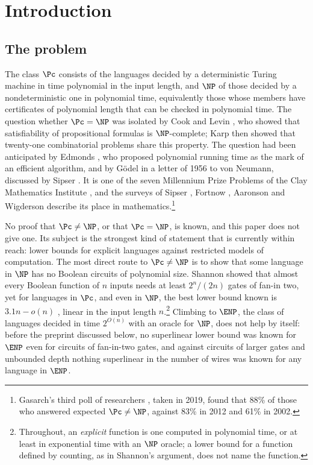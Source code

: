 
\section{Introduction}\label{sec:intro}

\subsection{The problem}
The class $\Pc$ consists of the languages decided by a deterministic Turing
machine in time polynomial in the input length, and $\NP$ of those decided by a
nondeterministic one in polynomial time, equivalently those whose members have
certificates of polynomial length that can be checked in polynomial time. The
question whether $\Pc=\NP$ was isolated by Cook \cite{Coo71} and Levin
\cite{Lev73}, who showed that satisfiability of propositional formulas is
$\NP$-complete; Karp \cite{Kar72} then showed that twenty-one combinatorial
problems share this property. The question had been anticipated by Edmonds
\cite{Edm65}, who proposed polynomial running time as the mark of an efficient
algorithm, and by G\"odel in a letter of 1956 to von Neumann, discussed by Sipser
\cite{Sip92}. It is one of the seven Millennium Prize Problems of the Clay
Mathematics Institute \cite{Clay}, and the surveys of Sipser \cite{Sip92},
Fortnow \cite{For09}, Aaronson \cite{Aar16} and Wigderson \cite{Wig19} describe
its place in mathematics.\footnote{Gasarch's third poll of researchers
\cite{Gas19}, taken in 2019, found that 88\% of those who answered expected
$\Pc\ne\NP$, against 83\% in 2012 and 61\% in 2002.}

No proof that $\Pc\ne\NP$, or that $\Pc=\NP$, is known, and this paper does not
give one. Its subject is the strongest kind of statement that is currently
within reach: lower bounds for explicit languages against restricted models of
computation. The most direct route to $\Pc\ne\NP$ is to show that some language
in $\NP$ has no Boolean circuits of polynomial size. Shannon \cite{Sha49}
showed that almost every Boolean function of $n$ inputs needs at least
$2^n/(2n)$ gates of fan-in two, yet for languages in $\Pc$, and even in $\NP$,
the best lower bound known is $3.1n-o(n)$ \cite{LY22}, linear in the input
length $n$.\footnote{Throughout, an \emph{explicit} function is one computed
in polynomial time, or at least in exponential time with an $\NP$ oracle; a
lower bound for a function defined by counting, as in Shannon's argument, does
not name the function.} Climbing to $\ENP$, the class of languages decided in
time $2^{O(n)}$ with an oracle for $\NP$, does not help by itself: before the
preprint \cite{OAI26} discussed below, no superlinear lower bound was known for
$\ENP$ even for circuits of fan-in-two gates, and against circuits of larger
gates and unbounded depth nothing superlinear in the number of wires was known
for any language in $\ENP$.


